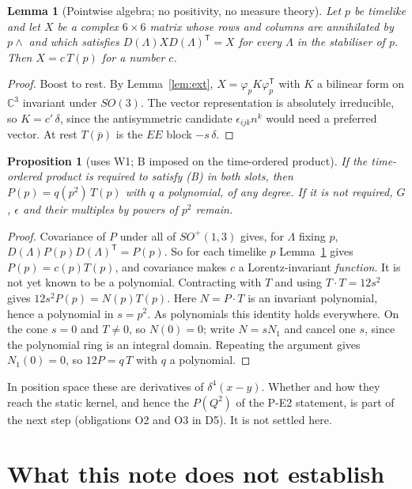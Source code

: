 \documentclass[11pt]{article}
\newtheorem{proposition}[theorem]{Proposition}
\newtheorem{lemma}[theorem]{Lemma}
\theoremstyle{remark}
\newcommand{\Tt}{T}
\begin{document}
\begin{lemma}[Pointwise algebra; no positivity, no measure theory]\label{lem:pointwise}
Let $p$ be timelike and let $X$ be a complex $6\times6$ matrix whose rows and
columns are annihilated by $p\wedge$ and which satisfies $D(\Lambda)XD(\Lambda)^{\mathsf T}=X$
for every $\Lambda$ in the stabiliser of $p$. Then $X=c\,\Tt(p)$ for a
number $c$.
\end{lemma}
\begin{proof}
Boost to rest. By Lemma~\ref{lem:ext}, $X=\varphi_pK\varphi_p^{\mathsf T}$ with $K$
a bilinear form on $\mathbb C^3$ invariant under $SO(3)$. The vector
representation is absolutely irreducible, so $K=c'\,\delta$, since the
antisymmetric candidate $\epsilon_{ijk}n^k$ would need a preferred vector. At
rest $\Tt(\bar p)$ is the $EE$ block $-s\,\delta$.
\end{proof}

\begin{proposition}[uses W1; B imposed on the time-ordered product]\label{prop:local}
If the time-ordered product is required to satisfy (B) in both slots, then
$P(p)=q(p^2)\,\Tt(p)$ with $q$ a polynomial, of any degree. If it is not
required, $G$, $\epsilon$ and their multiples by powers of $p^2$ remain.
\end{proposition}
\begin{proof}
Covariance of $P$ under all of $SO^+(1,3)$ gives, for $\Lambda$ fixing $p$,
$D(\Lambda)P(p)D(\Lambda)^{\mathsf T}=P(p)$. So for each timelike $p$
Lemma~\ref{lem:pointwise} gives $P(p)=c(p)\Tt(p)$, and covariance makes $c$ a
Lorentz-invariant \emph{function}. It is not yet known to be a polynomial.
Contracting with $\Tt$ and using
$\Tt\cdot\Tt=12s^2$ gives $12s^2P(p)=N(p)\Tt(p)$. Here $N=P\cdot\Tt$ is an
invariant polynomial, hence a polynomial in $s=p^2$. As polynomials this
identity holds everywhere. On the cone $s=0$ and $\Tt\neq0$, so $N(0)=0$; write
$N=sN_1$ and cancel one $s$, since the polynomial ring is an integral domain.
Repeating the argument gives $N_1(0)=0$, so $12P=q\,\Tt$ with $q$ a
polynomial.
\end{proof}
In position space these are derivatives of $\delta^{4}(x-y)$. Whether and how
they reach the static kernel, and hence the $P(Q^2)$ of the P-E2 statement,
is part of the next step (obligations O2 and O3 in D5). It is not settled
here.

\section{What this note does not establish}\label{sec:scope}
\end{document}

